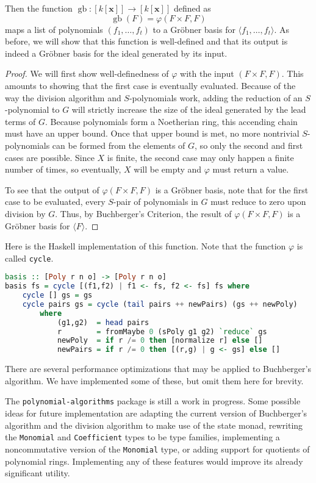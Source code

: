 \documentclass[MS, xcolor=dvipsnames]{wfuthesis}
\DeclareMathOperator{\gb}{gb}
\theoremstyle{definition}
\def\p{\varphi}
\begin{document}
Then the function $\gb: [k[\mathbf x]] \to [k[\mathbf x]]$ defined as
\[ \gb(F) = \p(F \times F,F) \]
maps a list of polynomials $(f_1,\dots,f_t)$ to a Gr\"obner basis for $\langle f_1,\dots,f_t \rangle$. As before, we will show that this function is well-defined and that its output is indeed a Gr\"obner basis for the ideal generated by its input.
\begin{proof}
  We will first show well-definedness of $\p$ with the input $(F \times F,F)$. This amounts to showing that the first case is eventually evaluated. Because of the way the division algorithm and $S$-polynomials work, adding the reduction of an $S$-polynomial to $G$ will strictly increase the size of the ideal generated by the lead terms of $G$. Because polynomials form a Noetherian ring, this accending chain must have an upper bound. Once that upper bound is met, no more nontrivial $S$-polynomials can be formed from the elements of $G$, so only the second and first cases are possible. Since $X$ is finite, the second case may only happen a finite number of times, so eventually, $X$ will be empty and $\p$ must return a value. \par
  To see that the output of $\p(F \times F,F)$ is a Gr\"obner basis, note that for the first case to be evaluated, every $S$-pair of polynomials in $G$ must reduce to zero upon division by $G$. Thus, by Buchberger's Criterion, the result of $\p(F \times F,F)$ is a Gr\"obner basis for $\langle F \rangle$.
\end{proof}
Here is the Haskell implementation of this function. Note that the function $\p$ is called \lstinline{cycle}.
\begin{lstlisting}[language=Haskell]
basis :: [Poly r n o] -> [Poly r n o]
basis fs = cycle [(f1,f2) | f1 <- fs, f2 <- fs] fs where
    cycle [] gs = gs
    cycle pairs gs = cycle (tail pairs ++ newPairs) (gs ++ newPoly)
        where
            (g1,g2)  = head pairs
            r        = fromMaybe 0 (sPoly g1 g2) `reduce` gs
            newPoly  = if r /= 0 then [normalize r] else []
            newPairs = if r /= 0 then [(r,g) | g <- gs] else []
\end{lstlisting}
There are several performance optimizations that may be applied to Buchberger's algorithm. We have implemented some of these, but omit them here for brevity. \par 
The \lstinline{polynomial-algorithms} package is still a work in progress. Some possible ideas for future implementation are adapting the current version of Buchberger's algorithm and the division algorithm to make use of the state monad, rewriting the \lstinline{Monomial} and \lstinline{Coefficient} types to be type families, implementing a noncommutative version of the \lstinline{Monomial} type, or adding support for quotients of polynomial rings. Implementing any of these features would improve its already significant utility.
\end{document}
